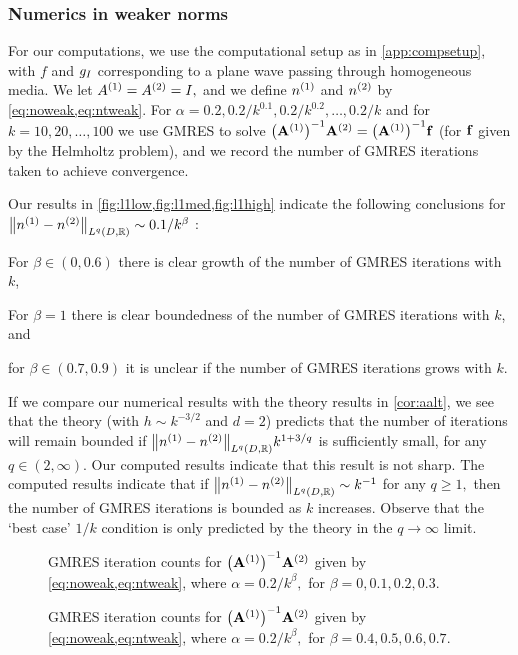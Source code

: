 \subsubsection{Numerics in weaker norms}\label{sec:weakernumerics}
For our computations, we use the computational setup as in \cref{app:compsetup}, with $f$ and $g_{I}$ corresponding to a plane wave passing through homogeneous media. We let ${A}^{(1)}={A}^{(2)}=I,$ and we define ${n}^{(1)}$ and ${n}^{(2)}$ by \cref{eq:noweak,eq:ntweak}. For $\alpha = 0.2,0.2/k^{0.1},0.2/k^{0.2},\ldots,0.2/k$ and for $k=10,20,\ldots,100$ we use GMRES to solve $\AmatoI\Amatt = \AmatoI \bff$ (for $\mathbf{f}$ given by the Helmholtz problem), and we record the number of GMRES iterations taken to achieve convergence.

Our results in \cref{fig:l1low,fig:l1med,fig:l1high} indicate the following conclusions for $\NLqDRR{\nso-\nst} \sim 0.1/k^{\beta}$ :
\bit
\item For $\beta \in (0,0.6)$ there is clear growth of the number of GMRES iterations with $k$,
\item For $\beta = 1$ there is clear boundedness of the number of GMRES iterations with $k$, and
  \item for $\beta \in (0.7,0.9)$ it is unclear if the number of GMRES iterations grows with $k.$
\eit

If we compare our numerical results with the theory results in \cref{cor:aalt}, we see that the theory (with $h \sim k^{-3/2}$ and $d=2$) predicts that the number of iterations will remain bounded if $\NLqDRR{\nso-\nst} k^{1+3/q}$ is sufficiently small, for any $q \in (2,\infty).$ Our computed results indicate that this result is not sharp. The computed results indicate that if $\NLqDRR{\nso-\nst} \sim k^{-1}$ for any $q \geq 1,$ then the number of GMRES iterations is bounded as $k$ increases. Observe that the `best case' $1/k$ condition is only predicted by the theory in the $q\rightarrow \infty$ limit.

\begin{figure}

  \caption{GMRES iteration counts for $\AmatoI\Amatt$ given by \cref{eq:noweak,eq:ntweak}, where $\alpha = 0.2/k^\beta,$ for $\beta = 0,0.1,0.2,0.3.$}\label{fig:l1low}
\end{figure}

\begin{figure}
  
    \caption{GMRES iteration counts for $\AmatoI\Amatt$ given by \cref{eq:noweak,eq:ntweak}, where $\alpha = 0.2/k^\beta,$ for $\beta = 0.4,0.5,0.6,0.7.$}\label{fig:l1med}
\end{figure}
    
